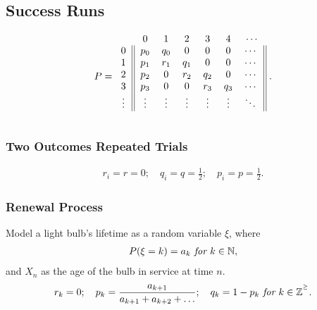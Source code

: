 \documentclass{article}
\begin{document}
\subsection{Success Runs}
\begin{align*}
    P = 
        \begin{blockarray}{ccccccc}
            & 0 & 1 & 2 & 3 & 4 & \cdots \\
            \begin{block}{c||cccccc||}
                0 & p_0 & q_0 & 0 & 0 & 0 & \cdots \\
                1 & p_1 & r_1 & q_1 & 0 & 0 & \cdots \\
                2 & p_2 & 0 & r_2 & q_2 & 0 & \cdots \\
                3 & p_3 & 0 & 0 & r_3 & q_3 & \cdots \\
                \vdots & \vdots & \vdots & \vdots & \vdots & \vdots & \ddots \\
            \end{block} 
        \end{blockarray}\; .
\end{align*}

\subsubsection{Two Outcomes Repeated Trials}
\begin{align*}
    r_i = r = 0; \quad q_i = q = \frac{1}{2}; \quad p_i = p = \frac{1}{2}.
\end{align*}

\subsubsection{Renewal Process} 
Model a light bulb's lifetime as a random variable $\xi$, where
\begin{align*}
    P(\xi=k) = a_k \emph{ for } k \in\mathbb{N},
\end{align*}
and $X_n$ as the age of the bulb in service at time $n$.
\begin{align*}
    r_k = 0; \quad p_k = \frac{a_{k+1}}{a_{k+1} + a_{k+2} + \dots}; \quad q_k = 1-p_k \emph{ for } k \in\mathbb{Z^{^\ge}}.
\end{align*}
\end{document}
